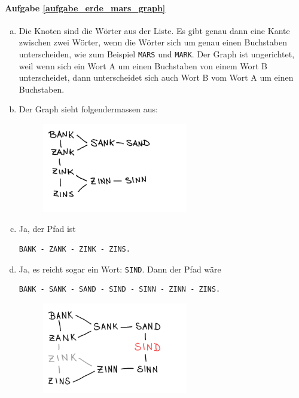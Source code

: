 \paragraph{Aufgabe \ref{aufgabe_erde_mars_graph}}
\begin{enumerate}[(a)]
    \item Die Knoten sind die Wörter aus der Liste. Es gibt genau dann eine Kante zwischen zwei Wörter, wenn die Wörter sich um genau einen Buchstaben unterscheiden, wie zum Beispiel \texttt{MARS} und \texttt{MARK}. Der Graph ist ungerichtet, weil wenn sich ein Wort A um einen Buchstaben von einem Wort B unterscheidet, dann unterscheidet sich auch Wort B vom Wort A um einen Buchstaben.
    
    \item Der Graph sieht fol­gen­der­ma­ssen aus:
    \begin{figure}[H]
    \centering
    \includegraphics[width=0.6\textwidth]{Pictures/SP/bank_zins.png}
\end{figure}

	\item Ja, der Pfad ist
	\begin{lstlisting}
BANK - ZANK - ZINK - ZINS.
	\end{lstlisting}
	
	\item Ja, es reicht sogar ein Wort: \texttt{SIND}. Dann der Pfad wäre
	\begin{lstlisting}
BANK - SANK - SAND - SIND - SINN - ZINN - ZINS.
	\end{lstlisting}
	\begin{figure}[H]
    \centering
    \includegraphics[width=0.6\textwidth]{Pictures/SP/bank_zins_sind.png}
\end{figure}	
\end{enumerate}

